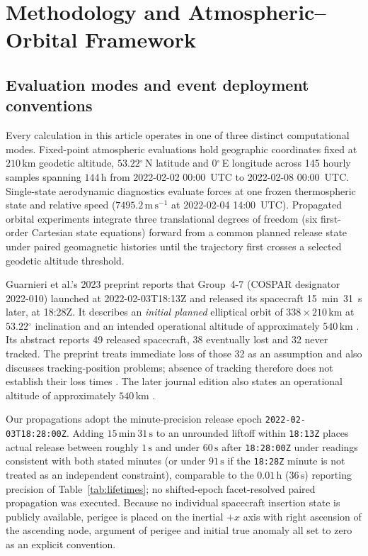\documentclass[12pt]{article}
\newcommand{\unit}[1]{\,\mathrm{#1}}
\newcommand{\degree}{\ensuremath{{}^\circ}}
\begin{document}
\section{Methodology and Atmospheric--Orbital Framework}
\label{sec:methods}

\subsection{Evaluation modes and event deployment conventions}
\label{sec:data}

Every calculation in this article operates in one of three distinct computational modes. Fixed-point atmospheric evaluations hold geographic coordinates fixed at $210\unit{km}$ geodetic altitude, $53.22\degree$\,N latitude and $0\degree$\,E longitude across 145 hourly samples spanning $144\unit{h}$ from 2022-02-02 00:00~UTC to 2022-02-08 00:00~UTC. Single-state aerodynamic diagnostics evaluate forces at one frozen thermospheric state and relative speed ($7495.2\unit{m\,s^{-1}}$ at 2022-02-04 14:00~UTC). Propagated orbital experiments integrate three translational degrees of freedom (six first-order Cartesian state equations) forward from a common planned release state under paired geomagnetic histories until the trajectory first crosses a selected geodetic altitude threshold.

Guarnieri et al.'s 2023 preprint reports that Group~4-7 (COSPAR designator 2022-010) launched at 2022-02-03T18:13Z and released its spacecraft 15~min~31~s later, at 18:28Z. It describes an \emph{initial planned} elliptical orbit of $338\times210\unit{km}$ at $53.22\degree$ inclination and an intended operational altitude of approximately $540\unit{km}$ \citep[\S2]{guarnieri2023v1}. Its abstract reports 49 released spacecraft, 38 eventually lost and 32 never tracked. The preprint treats immediate loss of those 32 as an assumption and also discusses tracking-position problems; absence of tracking therefore does not establish their loss times \citep[\S4]{guarnieri2023v1}. The later journal edition also states an operational altitude of approximately $540\unit{km}$ \citep[p.~76]{guarnieri2025}.

Our propagations adopt the minute-precision release epoch \texttt{2022-02-03T18:28:00Z}. Adding $15\unit{min}\ 31\unit{s}$ to an unrounded liftoff within \texttt{18:13Z} places actual release between roughly $1\unit{s}$ and under $60\unit{s}$ after \texttt{18:28:00Z} under readings consistent with both stated minutes (or under $91\unit{s}$ if the \texttt{18:28Z} minute is not treated as an independent constraint), comparable to the $0.01\unit{h}$ ($36\unit{s}$) reporting precision of Table~\ref{tab:lifetimes}; no shifted-epoch facet-resolved paired propagation was executed. Because no individual spacecraft insertion state is publicly available, perigee is placed on the inertial $+x$ axis with right ascension of the ascending node, argument of perigee and initial true anomaly all set to zero as an explicit convention.
\end{document}
